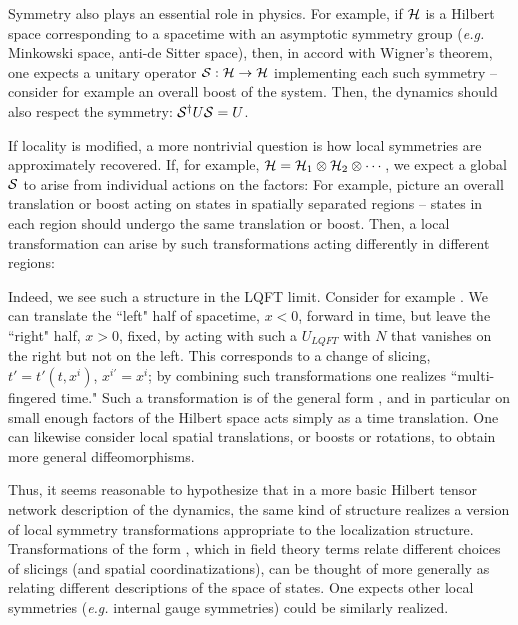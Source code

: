 Symmetry also plays an essential role in physics.  For example, if ${\cal H}$ is a Hilbert space corresponding to a spacetime with an asymptotic symmetry group ({\it e.g.} Minkowski space, anti-de Sitter space), then, in accord with Wigner's theorem, one expects a unitary operator ${\cal S}: {\cal H}\rightarrow{\cal H}$ implementing each such symmetry -- consider for example an overall boost of the system.  Then, the dynamics should also respect the symmetry: ${\cal S}^\dagger U{\cal S} = U$.  

If locality is modified, a more nontrivial question is how local symmetries are approximately recovered.  If, for example, ${\cal H}={\cal H}_1\otimes {\cal H}_2\otimes\cdots$, we expect a global  ${\cal S}$ to arise from individual actions on the factors:
%
\eqn{}
%
For example,  picture an overall translation or boost acting on states in spatially separated regions -- states in each region should undergo the same translation or boost.
Then, a local transformation can arise by such transformations acting differently in different regions: 
%
\eqn{}
% 

Indeed, we see such a structure in the LQFT limit.  Consider for example \unitop.  We can translate the ``left" half of spacetime, $x<0$, forward in time, but leave the ``right" half, $x>0$, fixed, by acting with such a $U_{LQFT}$ with $N$ that vanishes on the right but not on the left.  This corresponds to a change of slicing, $t'=t'(t,x^i)$, $x^{i\prime}=x^i$; by combining such transformations one realizes ``multi-fingered time."  Such a transformation is of the general form \sloc, and in particular on small enough factors of the Hilbert space acts simply as a time translation.  One can likewise consider local spatial translations, or boosts or rotations, to obtain more general diffeomorphisms.

Thus, it seems reasonable to hypothesize that in a more basic Hilbert tensor network description of the dynamics, the same kind of structure realizes a version of local symmetry transformations appropriate to the localization structure.  Transformations of the form \sloc, which in field theory terms relate different choices of slicings (and spatial coordinatizations), can be thought of more generally as relating different descriptions of the space of states.  One expects other local symmetries ({\it e.g.} internal gauge symmetries) could be similarly realized.


